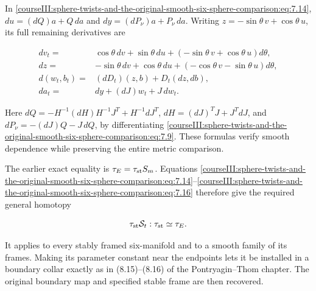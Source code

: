 In \eqref{courseIII:sphere-twists-and-the-original-smooth-six-sphere-comparison:eq:7.14}, \(du=(dQ)a+Q\,da\) and \(dy=(dP_\nu)a+P_\nu\,da\). Writing \(z=-\sin\theta\,v+\cos\theta\,u\), its full remaining derivatives are

\begin{equation}
\begin{split}
 dv_t={}&\cos\theta\,dv+\sin\theta\,du
                  +(-\sin\theta\,v+\cos\theta\,u)d\theta,\\
 dz={}&-\sin\theta\,dv+\cos\theta\,du
                  +(-\cos\theta\,v-\sin\theta\,u)d\theta,\\
 d(w_t,b_t)={}&(dD_t)(z,b)+D_t(dz,db),\\
 da_t={}&dy+(dJ)w_t+J\,dw_t .
 \end{split}
 \label{courseIII:sphere-twists-and-the-original-smooth-six-sphere-comparison:eq:7.18}
\end{equation}

Here \(dQ=-H^{-1}(dH)H^{-1}J^T+H^{-1}dJ^T\), \(dH=(dJ)^TJ+J^TdJ\), and \(dP_\nu=-(dJ)Q-J\,dQ\), by differentiating \eqref{courseIII:sphere-twists-and-the-original-smooth-six-sphere-comparison:eq:7.9}. These formulas verify smooth dependence while preserving the entire metric comparison.

The earlier exact equality is \(\tau_E=\tau_{\rm st}S_m\). Equations \eqref{courseIII:sphere-twists-and-the-original-smooth-six-sphere-comparison:eq:7.14}--\eqref{courseIII:sphere-twists-and-the-original-smooth-six-sphere-comparison:eq:7.16} therefore give the required general homotopy

\begin{equation}
\tau_{\rm st}\mathcal S_t:
                         \tau_{\rm st}\simeq\tau_E .
 \label{courseIII:sphere-twists-and-the-original-smooth-six-sphere-comparison:eq:7.19}
\end{equation}

It applies to every stably framed six-manifold and to a smooth family of its frames. Making its parameter constant near the endpoints lets it be installed in a boundary collar exactly as in (8.15)--(8.16) of the Pontryagin--Thom chapter. The original boundary map and specified stable frame are then recovered.

